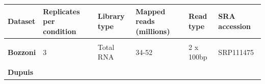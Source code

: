 \begin{longtable}[]{@{}llllll@{}}
	\begin{minipage}[t]{0.14\columnwidth}\raggedright\strut
		{\textbf{Dataset}}\strut
	\end{minipage} & \begin{minipage}[t]{0.14\columnwidth}\raggedright\strut
		{\textbf{Replicates per condition}}\strut
	\end{minipage} & \begin{minipage}[t]{0.14\columnwidth}\raggedright\strut
		{\textbf{Library type}}\strut
	\end{minipage} & \begin{minipage}[t]{0.14\columnwidth}\raggedright\strut
		{\textbf{Mapped reads (millions)}}\strut
	\end{minipage} & \begin{minipage}[t]{0.14\columnwidth}\raggedright\strut
		{\textbf{Read type}}\strut
	\end{minipage} & \begin{minipage}[t]{0.14\columnwidth}\raggedright\strut
		{\textbf{SRA accession}}\strut
	\end{minipage}\tabularnewline\toprule \\[-0.3cm]
	\begin{minipage}[t]{0.14\columnwidth}\raggedright\strut
		{\textbf{Bozzoni} }\strut
	\end{minipage} & \begin{minipage}[t]{0.14\columnwidth}\raggedright\strut
		{3}\strut
	\end{minipage} & \begin{minipage}[t]{0.14\columnwidth}\raggedright\strut
		{Total RNA}\strut
	\end{minipage} & \begin{minipage}[t]{0.14\columnwidth}\raggedright\strut
		{34-52}\strut
	\end{minipage} & \begin{minipage}[t]{0.14\columnwidth}\raggedright\strut
		{2 x 100bp}\strut
	\end{minipage} & \begin{minipage}[t]{0.14\columnwidth}\raggedright\strut
		{SRP111475}\strut
	\end{minipage}\tabularnewline \\
	\begin{minipage}[t]{0.14\columnwidth}\raggedright\strut
		{\textbf{Dupuis}}\strut
	\end{minipage} & \begin{minipage}[t]{0.14\columnwidth}\raggedright\strut

\end{minipage}
\end{longtable}
